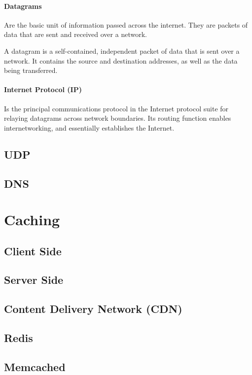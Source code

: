 \documentclass[a4paper]{article}
\begin{document}
    \paragraph*{Datagrams} Are the basic unit of information passed across the internet. They are packets of data that are sent and received over a network. 

    A datagram is a self-contained, independent packet of data that is sent over a network. It contains the source and destination addresses, as well as the data being transferred.

    \paragraph*{Internet Protocol (IP)} Is the principal communications protocol in the Internet protocol suite for relaying datagrams across network boundaries. Its routing function enables internetworking, and essentially establishes the Internet.





    \subsection{UDP}
    \subsection{DNS}

    \newpage
    \section{Caching}
    \subsection{Client Side}
    \subsection{Server Side}
    \subsection{Content Delivery Network (CDN)}
    \subsection{Redis}
    \subsection{Memcached}
\end{document}
